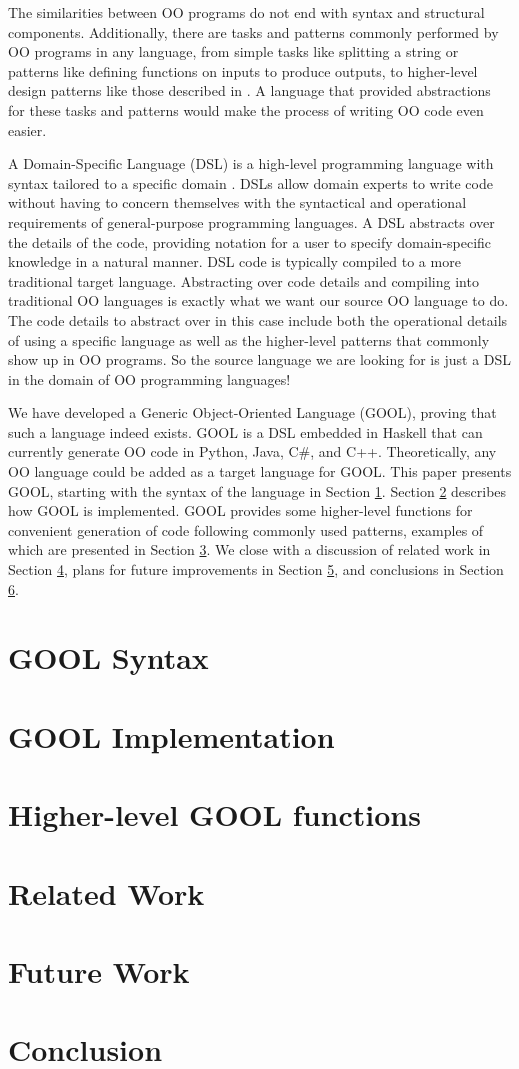 \documentclass[10pt,conference]{IEEEtran}
\begin{document}
The similarities between OO programs do not end with syntax and structural 
components. Additionally, there are tasks and patterns commonly performed by OO
programs in any language, from simple tasks like splitting a string or 
patterns like defining functions on inputs to produce outputs, to higher-level 
design patterns like those described in \cite{DesignPatterns}. A language 
that provided abstractions for these tasks and patterns would make the process 
of writing OO code even easier.

A Domain-Specific Language (DSL) is a high-level programming language with 
syntax tailored to a specific domain \cite{DSLs}. DSLs allow domain experts 
to write code without having to concern themselves with the syntactical and
operational requirements of general-purpose programming languages. A DSL
abstracts over the details of the code, providing notation for a user to
specify domain-specific knowledge in a natural manner. DSL code is typically
compiled to a more traditional target language. Abstracting over code details
and compiling into traditional OO languages is exactly what we want our source
OO language to do. The code details to abstract over in this case include both
the operational details of using a specific language as well as the higher-level
patterns that commonly show up in OO programs. So the source language we are
looking for is just a DSL in the domain of OO programming languages!

We have developed a Generic Object-Oriented Language (GOOL), proving that such 
a language indeed exists. GOOL is a DSL embedded in Haskell that can currently
generate OO code in Python, Java, C\#, and C++. Theoretically, any OO language 
could be added as a target language for GOOL. This paper presents GOOL, 
starting with the syntax of the language in Section \ref{syntax}. Section 
\ref{implementation} describes how GOOL is implemented. GOOL provides some 
higher-level functions for convenient generation of code following commonly 
used patterns, examples of which are presented in Section \ref{patterns}. We 
close with a discussion of related work in Section \ref{related}, plans for 
future improvements in Section \ref{future}, and conclusions in Section 
\ref{conclusions}.

\section{GOOL Syntax} \label{syntax}
\section{GOOL Implementation} \label{implementation}
\section{Higher-level GOOL functions} \label{patterns}
\section{Related Work} \label{related}
\section{Future Work} \label{future}
\section{Conclusion} \label{conclusions}



\end{document}

